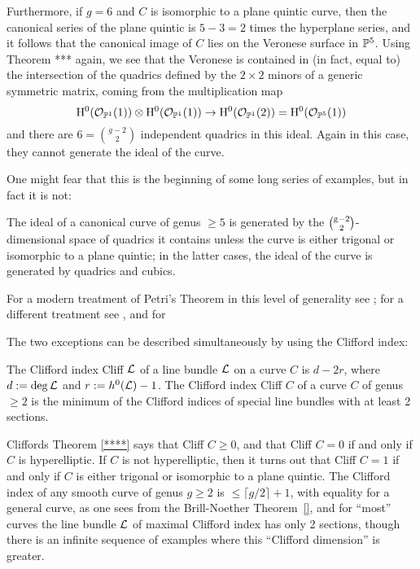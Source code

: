 Furthermore, if $g = 6$ and $C$ is isomorphic to a plane quintic curve, then the canonical series of the plane quintic is $5-3 = 2$ times the hyperplane series, and it follows that the canonical image of $C$ lies on the Veronese surface in $\PP^{5}$. Using Theorem *** again, we see that the Veronese is contained in (in fact, equal to) the intersection of the quadrics defined by the $2\times 2$ minors of a generic symmetric matrix, coming from the 
multiplication map 
$$
\HH^{0}(\sO_{\PP^{1}}(1))\otimes \HH^{0}(\sO_{\PP^{1}}(1)) \to \HH^{0}(\sO_{\PP^{1}}(2)) = \HH^{0}(\sO_{\PP^{5}}(1))
$$
and there are $6 = {g-2\choose 2}$ independent quadrics in this ideal. Again in this case, they cannot generate the ideal of the curve.

One might fear that this is the beginning of some long series of examples, but in fact it is not: 

\begin{theorem} [Petri]
The ideal of a canonical curve of genus $\geq 5$ is generated by the $\g-2\choose 2$-dimensional space of quadrics it contains unless the curve is either trigonal or isomorphic to a plane quintic; in the latter cases, the ideal of the curve is generated by quadrics and cubics.
\end{theorem}

For a modern treatment of Petri's Theorem in this level of generality see \cite{Schreyer}; for a different treatment see \cite{***}, and for

The two exceptions can be described simultaneously by using the Clifford index:

\begin{definition}
 The Clifford index Cliff $\sL$ of a line bundle $\sL$ on a curve $C$ is $d-2r$, where $d := \deg \sL$ and $r :=  h^0(\sL)-1$. The Clifford index Cliff $C$ of
 a curve $C$ of genus $\geq 2$ is the minimum of the Clifford indices of special line bundles with at least 2 sections.
\end{definition}

Cliffords Theorem \ref{****} says that Cliff $C \geq 0$, and that Cliff $C = 0$ if and only if $C$ is hyperelliptic. If $C$ is not hyperelliptic, then it turns out that Cliff $C=1$ if and only if $C$ is either trigonal or isomorphic to a plane quintic. The Clifford index of any smooth curve of genus $g\geq 2$ is $\leq \lceil g/2\rceil+1$, with equality for a general curve, as one sees from the Brill-Noether Theorem~\ref{}, and for ``most'' curves the line bundle $\sL$ of maximal Clifford index has only 2 sections, though there is an infinite sequence of examples where this
``Clifford dimension'' is greater.

